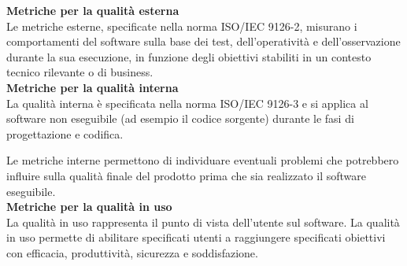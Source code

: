 		\textbf{Metriche per la qualità esterna}\\
		
			Le metriche esterne, specificate nella norma ISO/IEC 9126-2, misurano i comportamenti del software sulla base dei test, dell'operatività e dell'osservazione durante la sua esecuzione, in funzione degli obiettivi stabiliti in un contesto tecnico rilevante o di business.\\
			
		\textbf{Metriche per la qualità interna}\\
		
			La qualità interna è specificata nella norma ISO/IEC 9126-3 e si applica al software non eseguibile (ad esempio il codice sorgente) durante le fasi di progettazione e codifica. 

			Le metriche interne permettono di individuare eventuali problemi che potrebbero influire sulla qualità finale del prodotto prima che sia realizzato il software eseguibile.\\

		\textbf{Metriche per la qualità in uso}\\
		
			La qualità in uso rappresenta il punto di vista dell'utente sul software. La qualità in uso permette di abilitare specificati utenti a raggiungere specificati obiettivi con efficacia, produttività, sicurezza e soddisfazione.
